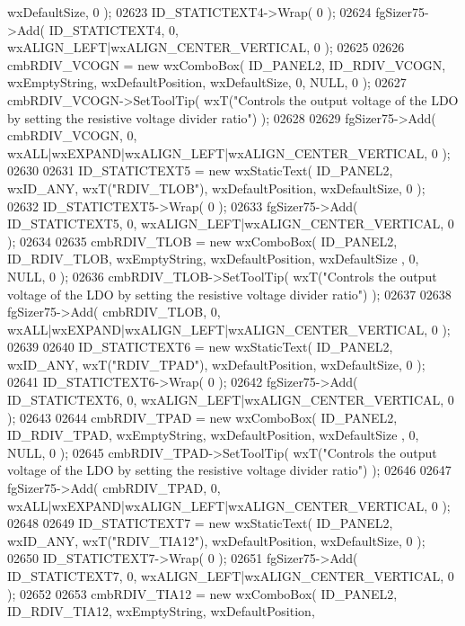 \begin{DoxyCode}
      wxDefaultSize, 0 );
02623     ID_STATICTEXT4->Wrap( 0 );
02624     fgSizer75->Add( ID_STATICTEXT4, 0, wxALIGN\_LEFT|wxALIGN\_CENTER\_VERTICAL, 0 );
02625     
02626     cmbRDIV_VCOGN = \textcolor{keyword}{new} wxComboBox( ID_PANEL2, ID_RDIV_VCOGN, wxEmptyString, wxDefaultPosition, 
      wxDefaultSize, 0, NULL, 0 ); 
02627     cmbRDIV_VCOGN->SetToolTip( wxT(\textcolor{stringliteral}{"Controls the output voltage of the LDO by setting the resistive voltage
       divider ratio"}) );
02628     
02629     fgSizer75->Add( cmbRDIV_VCOGN, 0, wxALL|wxEXPAND|wxALIGN\_LEFT|wxALIGN\_CENTER\_VERTICAL, 0 );
02630     
02631     ID_STATICTEXT5 = \textcolor{keyword}{new} wxStaticText( ID_PANEL2, wxID\_ANY, wxT(\textcolor{stringliteral}{"RDIV\_TLOB"}), wxDefaultPosition, 
      wxDefaultSize, 0 );
02632     ID_STATICTEXT5->Wrap( 0 );
02633     fgSizer75->Add( ID_STATICTEXT5, 0, wxALIGN\_LEFT|wxALIGN\_CENTER\_VERTICAL, 0 );
02634     
02635     cmbRDIV_TLOB = \textcolor{keyword}{new} wxComboBox( ID_PANEL2, ID_RDIV_TLOB, wxEmptyString, wxDefaultPosition, wxDefaultSize
      , 0, NULL, 0 ); 
02636     cmbRDIV_TLOB->SetToolTip( wxT(\textcolor{stringliteral}{"Controls the output voltage of the LDO by setting the resistive voltage
       divider ratio"}) );
02637     
02638     fgSizer75->Add( cmbRDIV_TLOB, 0, wxALL|wxEXPAND|wxALIGN\_LEFT|wxALIGN\_CENTER\_VERTICAL, 0 );
02639     
02640     ID_STATICTEXT6 = \textcolor{keyword}{new} wxStaticText( ID_PANEL2, wxID\_ANY, wxT(\textcolor{stringliteral}{"RDIV\_TPAD"}), wxDefaultPosition, 
      wxDefaultSize, 0 );
02641     ID_STATICTEXT6->Wrap( 0 );
02642     fgSizer75->Add( ID_STATICTEXT6, 0, wxALIGN\_LEFT|wxALIGN\_CENTER\_VERTICAL, 0 );
02643     
02644     cmbRDIV_TPAD = \textcolor{keyword}{new} wxComboBox( ID_PANEL2, ID_RDIV_TPAD, wxEmptyString, wxDefaultPosition, wxDefaultSize
      , 0, NULL, 0 ); 
02645     cmbRDIV_TPAD->SetToolTip( wxT(\textcolor{stringliteral}{"Controls the output voltage of the LDO by setting the resistive voltage
       divider ratio"}) );
02646     
02647     fgSizer75->Add( cmbRDIV_TPAD, 0, wxALL|wxEXPAND|wxALIGN\_LEFT|wxALIGN\_CENTER\_VERTICAL, 0 );
02648     
02649     ID_STATICTEXT7 = \textcolor{keyword}{new} wxStaticText( ID_PANEL2, wxID\_ANY, wxT(\textcolor{stringliteral}{"RDIV\_TIA12"}), wxDefaultPosition, 
      wxDefaultSize, 0 );
02650     ID_STATICTEXT7->Wrap( 0 );
02651     fgSizer75->Add( ID_STATICTEXT7, 0, wxALIGN\_LEFT|wxALIGN\_CENTER\_VERTICAL, 0 );
02652     
02653     cmbRDIV_TIA12 = \textcolor{keyword}{new} wxComboBox( ID_PANEL2, ID_RDIV_TIA12, wxEmptyString, wxDefaultPosition, 

\end{DoxyCode}
